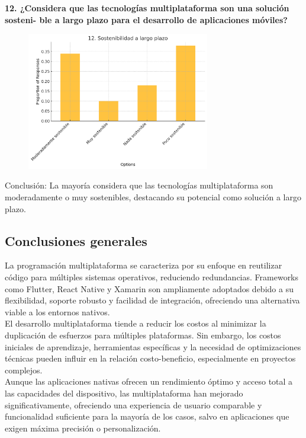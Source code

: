 \textbf{12. ¿Considera que las tecnologías multiplataforma son una solución sosteni-
ble a largo plazo para el desarrollo de aplicaciones móviles?}

\begin{figure}[h!]
    \includegraphics[width=8cm]{images/question12.png}
    \centering
\end{figure}

Conclusión: La mayoría considera que las tecnologías multiplataforma son moderadamente o muy sostenibles, destacando su potencial como solución a largo plazo.

\newpage
\subsection{Conclusiones generales}

La programación multiplataforma se caracteriza por su enfoque en reutilizar código para múltiples sistemas operativos, reduciendo redundancias. Frameworks como Flutter, React Native y Xamarin son ampliamente adoptados debido a su flexibilidad, soporte robusto y facilidad de integración, ofreciendo una alternativa viable a los entornos nativos.\\

El desarrollo multiplataforma tiende a reducir los costos al minimizar la duplicación de esfuerzos para múltiples plataformas. Sin embargo, los costos iniciales de aprendizaje, herramientas específicas y la necesidad de optimizaciones técnicas pueden influir en la relación costo-beneficio, especialmente en proyectos complejos.\\

Aunque las aplicaciones nativas ofrecen un rendimiento óptimo y acceso total a las capacidades del dispositivo, las multiplataforma han mejorado significativamente, ofreciendo una experiencia de usuario comparable y funcionalidad suficiente para la mayoría de los casos, salvo en aplicaciones que exigen máxima precisión o personalización.\\

